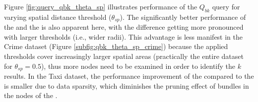Figure \ref{fig:query_qbk_theta_sp} illustrates performance of the $Q_{bk}$ query for varying spatial distance threshold ($\theta_{sp}$). The significantly better performance of the \tsr and the \btsr is also apparent here, with the difference getting more pronounced with larger thresholds (i.e., wider radii). This advantage is less manifest in the Crime dataset (Figure \ref{subfig:qbk_theta_sp_crime}) because the applied thresholds cover increasingly larger spatial areas (practically the entire dataset for $\theta_{sp} =0.5$), thus more nodes need to be examined in order to identify the $k$ results. In the Taxi dataset, the performance improvement of the \btsr compared to the \tsr is smaller due to data sparsity, which diminishes the pruning effect of bundles in the nodes of the \btsr.

\begin{figure}[!ht]
	\centering
	 \\

\end{figure}
